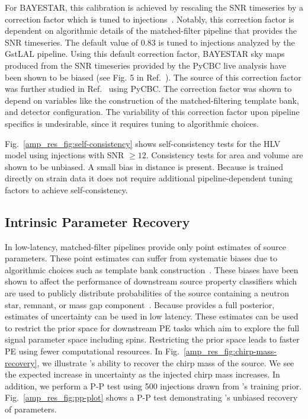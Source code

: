 \begin{refsection}
For BAYESTAR, this calibration is achieved by rescaling the SNR timeseries by a correction factor which is tuned to injections~\cite{Singer_2016}. 
Notably, this correction factor is dependent on algorithmic details of the matched-filter pipeline that provides the SNR timeseries. 
The default value of 0.83 is tuned to injections analyzed by the GstLAL pipeline. 
Using this default correction factor, BAYESTAR sky maps produced from the SNR timeseries provided by the PyCBC live analysis have been shown to be biased (see Fig. 5 in Ref.~\cite{Nitz_2018}). 
The source of this correction factor was further studied in Ref.~\cite{Duverne_2024} using PyCBC. 
The correction factor was shown to depend on variables like the construction of the matched-filtering template bank, and detector configuration. 
The variability of this correction factor upon pipeline specifics is undesirable, since it requires tuning to algorithmic choices.

Fig.~\ref{amp_res_fig:self-consistency} shows self-consistency tests for the HLV \amplfi model using injections with SNR $\geq 12$. 
Consistency tests for area and volume are shown to be unbiased. 
A small bias in distance is present. 
Because \amplfi is trained directly on strain data it does not require additional pipeline-dependent tuning factors to achieve self-consistency.

\subsection{Intrinsic Parameter Recovery}
\label{amp_res_sec:results-intrinsic}
In low-latency, matched-filter pipelines provide only point estimates of source parameters. 
These point estimates can suffer from systematic biases due to algorithmic choices such as template bank construction~\cite{Ewing:2023qqe}. 
These biases have been shown to affect the performance of downstream source property classifiers which are used to publicly distribute probabilities of the source containing a neutron star, remnant, or mass gap component~\cite{Chatterjee:2019avs}. 
Because \amplfi provides a full posterior, estimates of uncertainty can be used in low latency. 
These estimates can be used to restrict the prior space for downstream PE tasks which aim to explore the full signal parameter space including spins. 
Restricting the prior space leads to faster PE using fewer computational resources.
In Fig.~\ref{amp_res_fig:chirp-mass-recovery}, we illustrate \amplfi's ability to recover the chirp mass of the source. 
We see the expected increase in uncertainty as the injected chirp mass increases. 
In addition, we perform a P-P test using 500 injections drawn from \amplfi's training prior. 
Fig.~\ref{amp_res_fig:pp-plot} shows a P-P test demonstrating \amplfi's unbiased recovery of parameters.


\end{refsection}
